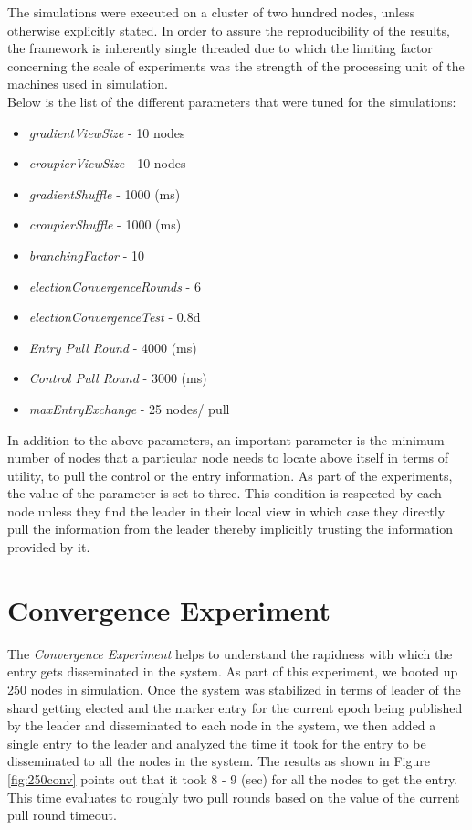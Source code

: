 \documentclass[12pt,a4paper,twoside,openright]{book}
\begin{document}
The simulations were executed on a cluster of two hundred nodes, unless otherwise explicitly stated. In order to assure the reproducibility of the results, the framework is inherently single threaded due to which the limiting factor concerning the scale of experiments was the strength of the processing unit of the machines used in simulation. \\

Below is the list of the different parameters that were tuned for the simulations:


\begin{itemize}
\setlength\itemsep{0em}
\item \textit{gradientViewSize} - 10 nodes
\item \textit{croupierViewSize} - 10 nodes
\item \textit{gradientShuffle} - 1000 (ms)
\item \textit{croupierShuffle} - 1000 (ms)
\item \textit{branchingFactor} - 10
\item \textit{electionConvergenceRounds} - 6
\item \textit{electionConvergenceTest} - 0.8d
\item \textit{Entry Pull Round} - 4000 (ms)
\item \textit{Control Pull Round} - 3000 (ms)
\item \textit{maxEntryExchange} - 25 nodes/ pull
\end{itemize}

In addition to the above parameters, an important parameter is the minimum number of nodes that a particular node needs to locate above itself in terms of utility, to pull the control or the entry information. As part of the experiments, the value of the parameter is set to three. This condition is respected by each node unless they find the leader in their local view in which case they directly pull the information from the leader thereby implicitly trusting the information provided by it.


\section{Convergence Experiment}

The \textit{Convergence Experiment} helps to understand the rapidness with which the entry gets disseminated in the system. As part of this experiment, we booted up 250 nodes in simulation. Once the system was stabilized in terms of leader of the shard getting elected and the marker entry for the current epoch being published by the leader and disseminated to each node in the system, we then added a single entry to the leader and analyzed the time it took for the entry to be disseminated to all the nodes in the system. The results as shown in Figure \ref{fig:250conv} points out that it took 8 - 9 (sec) for all the nodes to get the entry. This time evaluates to roughly two pull rounds based on the value of the current pull round timeout.
\end{document}
